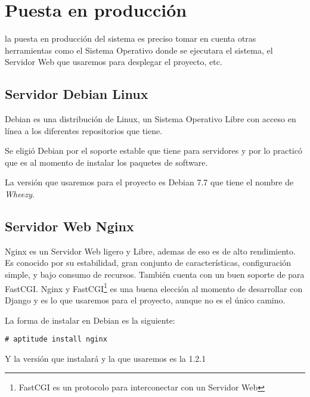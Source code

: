 \begin{savequote}[75mm]
\end{savequote}

\chapter{Puesta en producción}

 la puesta en producción del sistema es preciso tomar en cuenta
otras herramientas como el Sistema Operativo donde se ejecutara el sistema,
el Servidor Web que usaremos para desplegar el proyecto, etc.

\section{Servidor Debian Linux}
Debian es una distribución de Linux, un Sistema Operativo Libre con acceso en línea
a los diferentes repositorios que tiene.

Se eligió Debian por el soporte estable que tiene para servidores y por lo practicó
que es al momento de instalar los paquetes de software.

La versión que usaremos para el proyecto es Debian 7.7 que tiene el nombre de
{\it Wheezy}.

\section{Servidor Web Nginx}
Nginx es un Servidor Web ligero y Libre, ademas de eso es de alto rendimiento.
Es conocido por su estabilidad, gran conjunto de características, configuración
simple, y bajo consumo de recursos.
También cuenta con un buen soporte de para FastCGI. Nginx y FastCGI\footnote{FastCGI
es un protocolo para interconectar con un Servidor Web} es una buena elección
al momento de desarrollar con Django y es lo que usaremos para el proyecto,
aunque no es el único camino.

La forma de instalar en Debian es la siguiente:

\begin{verbatim}
# aptitude install nginx
\end{verbatim}

Y la versión que instalará y la que usaremos es la 1.2.1

